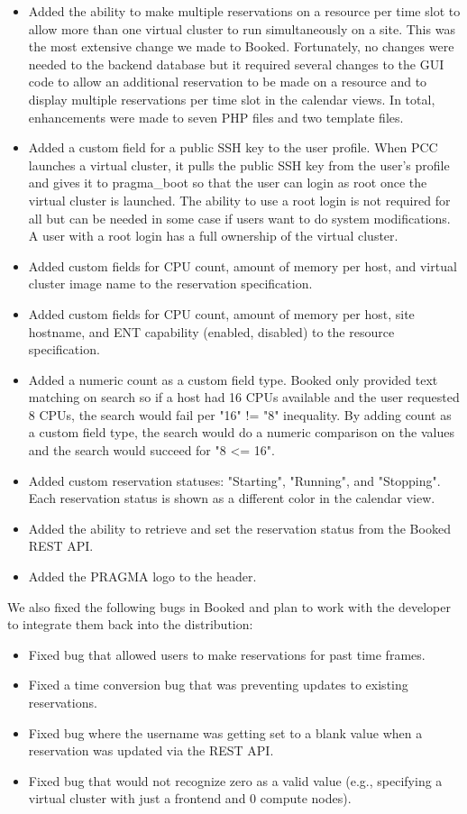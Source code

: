 \documentclass[times]{cpeauth}
\begin{document}
\begin{itemize}
\item Added the ability to make multiple reservations on a resource per time slot to allow more than one virtual cluster to run simultaneously on a site.   This was the most extensive change we made to Booked.  Fortunately, no changes were needed to the backend database but it required several changes to the GUI code to allow an additional reservation to be made on a resource and to display multiple reservations per time slot in the calendar views.  In total, enhancements were made to seven PHP files and two template files.
\item Added a custom field for a public SSH key  to the user profile.  When PCC launches a virtual cluster, it pulls the public SSH key from the user's  profile and gives it to pragma\_boot so that the user can login as root once the virtual cluster is launched.   The ability to use a root login is not required for all but can be needed in some case if users want to do system modifications. A user with a root login has a full ownership of the virtual cluster. 
\item Added custom fields for CPU count, amount of memory per host, and virtual cluster image name to the reservation specification.
\item Added custom fields for CPU count, amount of memory per host, site hostname, and ENT capability (enabled, disabled) to the resource specification.
\item Added a numeric count as a custom field type.  Booked only provided text matching on search so if a host had 16 CPUs available and the user requested 8 CPUs, the search would fail per "16" != "8" inequality.  By adding count as a custom field type, the search would do a numeric comparison on the values and the search would succeed for "8 \textless= 16".
\item Added custom reservation statuses: "Starting", "Running", and "Stopping".  Each reservation status is shown as a different color in  the calendar view.
\item Added the ability to retrieve and set the reservation status from the Booked REST API.  	
\item Added the PRAGMA logo to the header.
\end{itemize}

We also fixed the following bugs in Booked and plan to work with the developer to integrate them back into the distribution:

\begin{itemize}
\item Fixed bug that allowed users to make reservations for past time frames.
\item Fixed a time conversion bug that was preventing updates to existing reservations.
\item Fixed bug where the username was getting set to a blank value when a reservation was updated via the REST API. 
\item Fixed bug that would not recognize zero as a valid value (e.g., specifying a virtual cluster with just a frontend and 0 compute nodes).  
\end{itemize}
\end{document}
